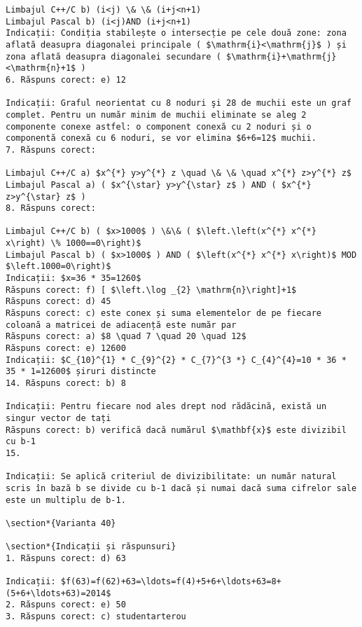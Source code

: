 \begin{verbatim}
Limbajul C++/C b) (i<j) \& \& (i+j<n+1)
Limbajul Pascal b) (i<j)AND (i+j<n+1)
Indicații: Condiția stabilește o intersecție pe cele două zone: zona aflată deasupra diagonalei principale ( $\mathrm{i}<\mathrm{j}$ ) și zona aflată deasupra diagonalei secundare ( $\mathrm{i}+\mathrm{j}<\mathrm{n}+1$ )
6. Răspuns corect: e) 12

Indicații: Graful neorientat cu 8 noduri şi 28 de muchii este un graf complet. Pentru un număr minim de muchii eliminate se aleg 2 componente conexe astfel: o component conexă cu 2 noduri și o componentă conexă cu 6 noduri, se vor elimina $6+6=12$ muchii.
7. Răspuns corect:

Limbajul C++/C a) $x^{*} y>y^{*} z \quad \& \& \quad x^{*} z>y^{*} z$
Limbajul Pascal a) ( $x^{\star} y>y^{\star} z$ ) AND ( $x^{*} z>y^{\star} z$ )
8. Răspuns corect:

Limbajul C++/C b) ( $x>1000$ ) \&\& ( $\left.\left(x^{*} x^{*} x\right) \% 1000==0\right)$
Limbajul Pascal b) ( $x>1000$ ) AND ( $\left(x^{*} x^{*} x\right)$ MOD $\left.1000=0\right)$
Indicații: $x=36 * 35=1260$
Răspuns corect: f) [ $\left.\log _{2} \mathrm{n}\right]+1$
Răspuns corect: d) 45
Răspuns corect: c) este conex și suma elementelor de pe fiecare coloană a matricei de adiacență este număr par
Răspuns corect: a) $8 \quad 7 \quad 20 \quad 12$
Răspuns corect: e) 12600
Indicații: $C_{10}^{1} * C_{9}^{2} * C_{7}^{3 *} C_{4}^{4}=10 * 36 * 35 * 1=12600$ șiruri distincte
14. Răspuns corect: b) 8

Indicații: Pentru fiecare nod ales drept nod rădăcină, există un singur vector de tați
Răspuns corect: b) verifică dacă numărul $\mathbf{x}$ este divizibil cu b-1
15.

Indicații: Se aplică criteriul de divizibilitate: un număr natural scris în bază b se divide cu b-1 dacă și numai dacă suma cifrelor sale este un multiplu de b-1.

\section*{Varianta 40}

\section*{Indicații și răspunsuri}
1. Răspuns corect: d) 63

Indicații: $f(63)=f(62)+63=\ldots=f(4)+5+6+\ldots+63=8+(5+6+\ldots+63)=2014$
2. Răspuns corect: e) 50
3. Răspuns corect: c) studentarterou


\end{verbatim}
